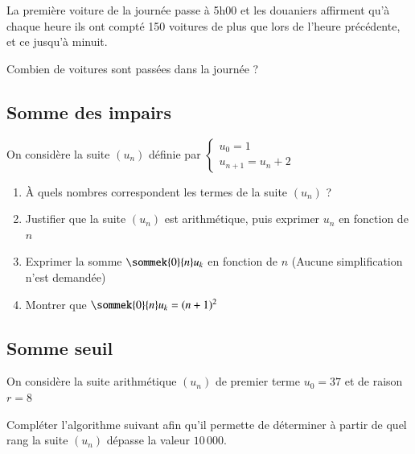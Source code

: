 \documentclass[oneside,12pt]{article}          %
\begin{document}
La première voiture de la journée passe à 5h00 et les douaniers affirment qu'à chaque heure ils ont compté 150 voitures de plus que lors de l'heure précédente, et ce jusqu'à minuit.

Combien de voitures sont passées dans la journée ?



\subsection{Somme des impairs}
On considère la suite $(u_n)$ définie par $\begin{cases}u_0 = 1 \\ u_{n+1} = u_n + 2\end{cases}$
\begin{enumerate}
	\item À quels nombres correspondent les termes de la suite $(u_n)$ ?
	\item Justifier que la suite $(u_n)$ est arithmétique, puis exprimer $u_n$ en fonction de $n$
	\item Exprimer la somme $\sommek{0}{n}u_k$ en fonction de $n$ (Aucune simplification n'est demandée)
	\item Montrer que $\sommek{0}{n}u_k = (n+1)^2$
\end{enumerate}



\subsection{Somme seuil}
On considère la suite arithmétique $(u_n)$ de premier terme $u_0 = 37$ et de raison $r = 8$

Compléter l'algorithme suivant afin qu'il permette de déterminer à partir de quel rang la suite $(u_n)$ dépasse la valeur $10\,000$.
\begin{center}
	\renewcommand{\arraystretch}{1.25}
\end{center}
\end{document}
